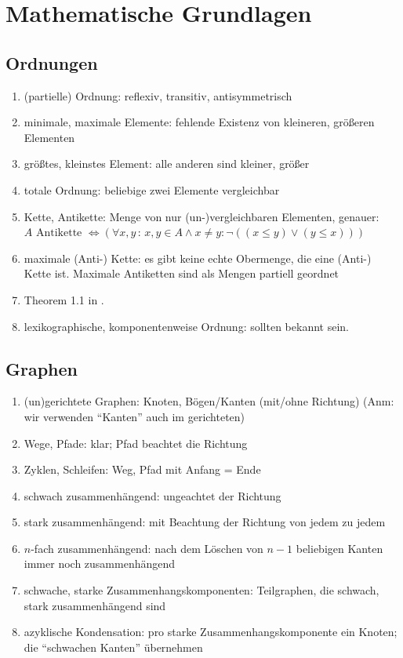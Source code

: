 
\section{Mathematische Grundlagen}
\subsection{Ordnungen}
\begin{enumerate}
	\item (partielle) Ordnung: reflexiv, transitiv, antisymmetrisch
	\item minimale, maximale Elemente: fehlende Existenz von kleineren, größeren Elementen
	\item größtes, kleinstes Element: alle anderen sind kleiner, größer
	\item totale Ordnung: beliebige zwei Elemente vergleichbar
	\item Kette, Antikette: Menge von nur (un-)vergleichbaren Elementen, genauer:
		$A \text{ Antikette } \Leftrightarrow (\forall x,y \, :\, x,y\in A \land x\not= y : \neg ((x\leq y) \lor  (y\leq x)))$
	\item maximale (Anti-) Kette: es gibt keine echte Obermenge, die eine \hbox{(Anti-)} Kette ist.
		Maximale Antiketten sind als Mengen partiell geordnet
	\item Theorem 1.1 in \cite{Ban93}.
	\item lexikographische, komponentenweise Ordnung: sollten bekannt sein.
\end{enumerate}

\subsection{Graphen}

\begin{enumerate}
	\item (un)gerichtete Graphen: Knoten, Bögen/Kanten (mit/ohne Richtung) (Anm: wir verwenden ``Kanten'' auch im gerichteten)
	\item Wege, Pfade: klar; Pfad beachtet die Richtung
	\item Zyklen, Schleifen: Weg, Pfad mit Anfang = Ende
	\item schwach zusammenhängend: ungeachtet der Richtung
	\item stark zusammenhängend: mit Beachtung der Richtung von jedem zu jedem
	\item $n$-fach zusammenhängend: nach dem Löschen von $n\!-\!1$ beliebigen Kanten immer noch zusammenhängend
	\item schwache, starke Zusammenhangskomponenten: Teilgraphen, die schwach, stark zusammenhängend sind
	\item azyklische Kondensation: pro starke Zusammenhangskomponente ein Knoten; die ``schwachen Kanten'' übernehmen
\end{enumerate}

